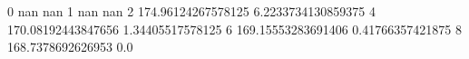 0 nan nan
1 nan nan
2 174.96124267578125 6.2233734130859375
4 170.08192443847656 1.34405517578125
6 169.15553283691406 0.41766357421875
8 168.7378692626953 0.0
